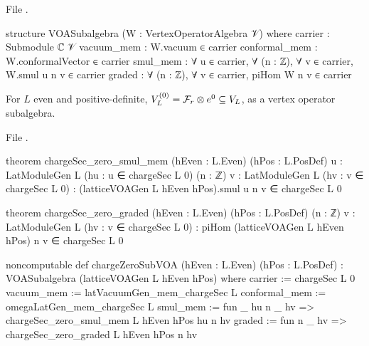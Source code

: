 \noindent File .
\begin{leancode}
structure VOASubalgebra (W : VertexOperatorAlgebra 𝒱) where
  carrier : Submodule ℂ 𝒱
  vacuum_mem : W.vacuum ∈ carrier
  conformal_mem : W.conformalVector ∈ carrier
  smul_mem : ∀ u ∈ carrier, ∀ (n : ℤ), ∀ v ∈ carrier, W.smul u n v ∈ carrier
  graded : ∀ (n : ℤ), ∀ v ∈ carrier, piHom W n v ∈ carrier
\end{leancode}

\begin{definition}\label{l05:def:chargeZero}
For $L$ even and positive-definite, $V_L^{(0)}=\mathcal{F}_r\otimes e^0\subseteq V_L$, as a vertex operator subalgebra.
\end{definition}

\noindent File .
\begin{leancode}
theorem chargeSec_zero_smul_mem (hEven : L.Even) (hPos : L.PosDef)
    {u : LatModuleGen L} (hu : u ∈ chargeSec L 0) (n : ℤ)
    {v : LatModuleGen L} (hv : v ∈ chargeSec L 0) :
    (latticeVOAGen L hEven hPos).smul u n v ∈ chargeSec L 0

theorem chargeSec_zero_graded (hEven : L.Even) (hPos : L.PosDef)
    (n : ℤ) {v : LatModuleGen L} (hv : v ∈ chargeSec L 0) :
    piHom (latticeVOAGen L hEven hPos) n v ∈ chargeSec L 0

noncomputable def chargeZeroSubVOA (hEven : L.Even) (hPos : L.PosDef) :
    VOASubalgebra (latticeVOAGen L hEven hPos) where
  carrier := chargeSec L 0
  vacuum_mem := latVacuumGen_mem_chargeSec L
  conformal_mem := omegaLatGen_mem_chargeSec L
  smul_mem := fun _ hu n _ hv => chargeSec_zero_smul_mem L hEven hPos hu n hv
  graded := fun n _ hv => chargeSec_zero_graded L hEven hPos n hv
\end{leancode}

